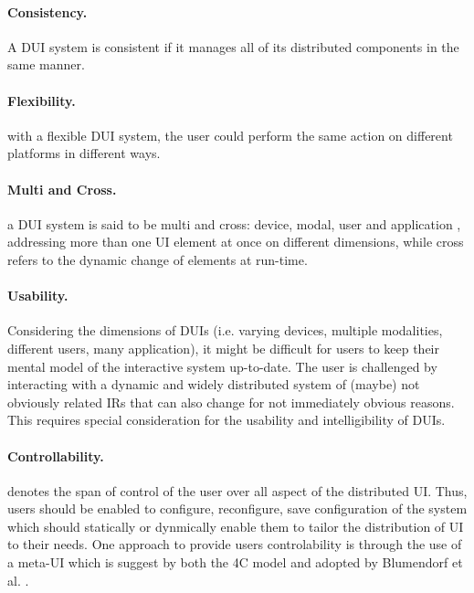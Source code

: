 \paragraph{Consistency.} A DUI system is consistent if it manages all of its
distributed components in the same manner.\cite{lopez2011formal}\\

\paragraph{Flexibility.} with a flexible DUI system, the
user could perform the same action on different platforms in different
ways.\cite{lopez2011formal}\\

\paragraph{Multi and Cross.} a DUI system is said to be multi and cross:
device, modal, user and application  \cite{blumendorf2011distributed},
addressing more than one UI element at once on different dimensions, while cross
refers to the dynamic change of elements at run-time.\\

\paragraph{Usability.}
\cite{blumendorf2011distributed}Considering the dimensions of DUIs (i.e. varying
devices, multiple modalities, different users, many application), it might be
difficult for users to keep their mental model of the interactive system up-to-date. The user is challenged by interacting with a dynamic and widely distributed system of (maybe) not obviously related IRs that can also change for not immediately obvious reasons. This requires special consideration for the usability and intelligibility of DUIs.\\

\paragraph{Controllability.} denotes the span of control of the user over all
aspect of the distributed UI. Thus, users should be enabled to configure,
reconfigure, save configuration of the system which should statically or
dynmically enable them to tailor the distribution of UI to their needs. One
approach to provide users controlability is through the use of a meta-UI which
is suggest by both the 4C model \cite{demeure20084c} and adopted by Blumendorf
et al. \cite{blumendorf2011distributed}.\\

